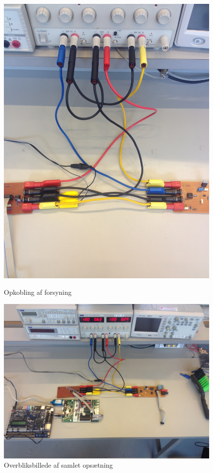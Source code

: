 \begin{figure}[H]
  \begin{minipage}{0.45\textwidth}
    \centering
      \includegraphics[width=\textwidth]{billeder/IntTest/forsyning}
      \caption{Opkobling af forsyning}
    \label{fig:opkobling_forsyning}
  \end{minipage}
  \hspace{0.1\textwidth}
  \begin{minipage}{0.45\textwidth}
    \centering
      \includegraphics[width=\textwidth]{billeder/IntTest/system}
      \caption{Overbliksbillede af samlet opsætning}
    \label{fig:system_sammensat}
  \end{minipage}
\end{figure}

